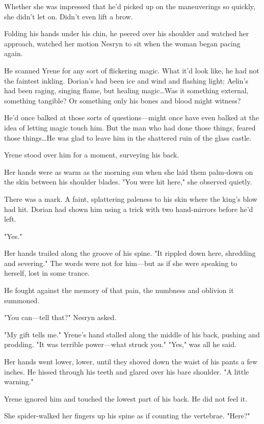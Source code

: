 Whether she was impressed that he'd picked up on the maneuverings so quickly, she didn't let on. Didn't even lift a brow.

Folding his hands under his chin, he peered over his shoulder and watched her approach, watched her motion Nesryn to sit when the woman began pacing again.

He scanned Yrene for any sort of flickering magic. What it'd look like, he had not the faintest inkling. Dorian's had been ice and wind and flashing light; Aelin's had been raging, singing flame, but healing magic\ldots Was it something external, something tangible? Or something only his bones and blood might witness?

He'd once balked at those sorts of questions---might once have even balked at the idea of letting magic touch him. But the man who had done those things, feared those things\ldots He was glad to leave him in the shattered ruin of the glass castle.

Yrene stood over him for a moment, surveying his back.

Her hands were as warm as the morning sun when she laid them palm-down on the skin between his shoulder blades. "You were hit here," she observed quietly.

There was a mark. A faint, splattering paleness to his skin where the king's blow had hit. Dorian had shown him using a trick with two hand-mirrors before he'd left.

"Yes."

Her hands trailed along the groove of his spine. "It rippled down here, shredding and severing." The words were not for him---but as if she were speaking to herself, lost in some trance.

He fought against the memory of that pain, the numbness and oblivion it summoned.

"You can---tell that?" Nesryn asked.

"My gift tells me." Yrene's hand stalled along the middle of his back, pushing and prodding. "It was terrible power---what struck you." "Yes," was all he said.

Her hands went lower, lower, until they shoved down the waist of his pants a few inches. He hissed through his teeth and glared over his bare shoulder. "A little warning."

Yrene ignored him and touched the lowest part of his back. He did not feel it.

She spider-walked her fingers up his spine as if counting the vertebrae. "Here?"

